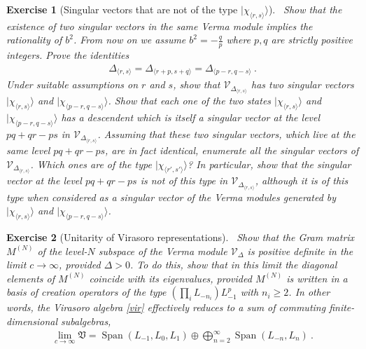 \documentclass[12pt, a4paper, notitlepage, twoside]{report}
\numberwithin{equation}{section}
\theoremstyle{break}
\newtheorem{exo}{Exercise}[chapter]
\begin{document}
\begin{exo}[Singular vectors that are not of the type $|\chi_{\langle r,s \rangle}\rangle$]
 ~\label{exosv}
Show that the existence of two singular vectors in the same Verma module implies the rationality of $b^2$. 
From now on we assume $b^2=-\frac{q}{p}$ where $p,q$ are strictly positive integers.
Prove the identities 
\begin{align}
 \Delta_{\langle r,s \rangle}=\Delta_{\langle r+p,s+q \rangle}=\Delta_{\langle p-r,q-s \rangle}\ .
\end{align}
Under suitable assumptions on $r$ and $s$, show that $\mathcal{V}_{\Delta_{\langle r,s \rangle}}$ has two singular vectors $|\chi_{\langle r,s \rangle}\rangle$ and $|\chi_{\langle p-r,q-s \rangle}\rangle$.
Show that each one of the two states  $|\chi_{\langle r,s \rangle}\rangle$ and $|\chi_{\langle p-r,q-s \rangle}\rangle$ has a descendent which is itself a singular vector at the level $pq+qr-ps$ in $\mathcal{V}_{\Delta_{\langle r,s \rangle}}$.
Assuming that these two singular vectors, which live at the same level $pq+qr-ps$, are in fact identical, enumerate all the singular vectors of $\mathcal{V}_{\Delta_{\langle r,s \rangle}}$.
Which ones are of the type $|\chi_{\langle r',s' \rangle}\rangle$? In particular, show that the singular vector at the level $pq+qr-ps$ is not of this type in $\mathcal{V}_{\Delta_{\langle r,s \rangle}}$, although it is of this type when considered as a singular vector of the Verma modules generated by $|\chi_{\langle r,s \rangle}\rangle$ and $|\chi_{\langle p-r,q-s \rangle}\rangle$.
\end{exo}

\begin{exo}[Unitarity of Virasoro representations]
~\label{exoun}
Show that the Gram matrix $M^{(N)}$ of the level-$N$ subspace of the Verma module $\mathcal{V}_\Delta$ is positive definite in the limit $c\to \infty$, provided  $\Delta >0$. 
To do this, show that in this limit the diagonal elements of $M^{(N)}$ coincide with its eigenvalues, provided $M^{(N)}$ is written in a basis of creation operators of the type $(\prod_i L_{-n_i}) L_{-1}^p$ with $n_i\geq 2$.
In other words, the Virasoro algebra \eqref{vir} effectively reduces to a sum of commuting finite-dimensional subalgebras, 
\begin{align}
 \underset{c\to \infty}{\lim} \mathfrak{V}  
=  \operatorname{Span}(L_{-1},L_0,L_1) \oplus \bigoplus_{n=2}^\infty \operatorname{Span} (L_{-n}, L_n)\ .
\end{align}
\end{exo}
\end{document}
